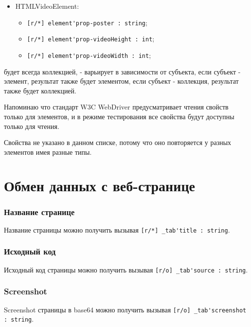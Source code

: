 \documentclass[a4paper, 14pt]{extarticle}
\newenvironment{icItems}
	{ \begin{itemize} [noitemsep,nolistsep] }
	{ \end{itemize} }
\begin{document}
\begin{icItems}
	\item HTMLVideoElement:
	\begin{icItems}
		\item \lstinline|[r/*] element'prop-poster : string|;
		\item \lstinline|[r/*] element'prop-videoHeight : int|;
		\item \lstinline|[r/*] element'prop-videoWidth : int|;
	\end{icItems}
	
\end{icItems}

 будет всегда коллекцией,  - варьирует в зависимости от субъекта, если субъект - элемент, результат также будет элементом, если субъект - коллекция, результат также будет коллекцией. 

Напоминаю что стандарт W3C WebDriver предусматривает чтения свойств только для элементов, и в режиме тестирования все свойства будут доступны только для чтения.

Свойства  не указано в данном списке, потому что оно повторяется у разных элементов имея разные типы.

\section{Обмен данных с веб-странице}
\label{dataexchange}

\subsubsection{Название странице}

Название страницы можно получить вызывая \lstinline|[r/*] _tab'title : string|.

\subsubsection{Исходный код}

Исходный код страницы можно получить вызывая \lstinline|[r/o] _tab'source : string|.

\subsubsection{Screenshot}

Screenshot страницы в base64 можно получить вызывая \lstinline|[r/o] _tab'screenshot : string|.
\end{document}
